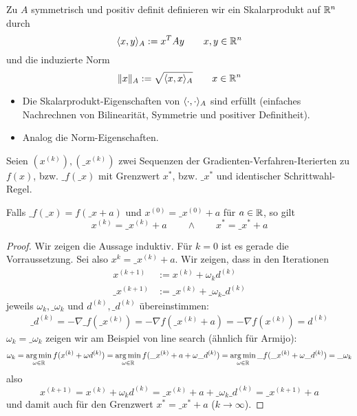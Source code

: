 \documentclass[
]{mycourse}
\begin{document}
\begin{df} \label{4.14}
	Zu $A$ symmetrisch und positiv definit definieren wir ein Skalarprodukt auf $\mathbb{R}^n$ durch
	\[
		\langle x, y\rangle_A := x^T A y
		\qquad x,y \in \mathbb{R}^n
	\]
	und die induzierte Norm
	\[
		\|x\|_A := \sqrt{\langle x,x\rangle_A}
		\qquad x \in \mathbb{R}^n
	\]
	\begin{note}
		\begin{itemize}
			\item
				Die Skalarprodukt-Eigenschaften von $\langle\cdot, \cdot\rangle_A$ sind erfüllt (einfaches Nachrechnen von Bilinearität, Symmetrie und positiver Definitheit).
			\item
				Analog die Norm-Eigenschaften.
		\end{itemize}
	\end{note}
\end{df}

\begin{lem*}[Translationsinvarianz]
	Seien $(x^{(k)}), (\_x^{(k)})$ zwei Sequenzen der Gradienten-Verfahren-Iterierten zu $f(x)$, bzw. $\_f(\_x)$ mit Grenzwert $x^*$, bzw. $\_x^*$ und identischer Schrittwahl-Regel.

	Falls $\_f(\_x) = f(\_x + a)$ und $x^{(0)} = \_x^{(0)} + a$ für $a \in \mathbb{R}$, so gilt
	\[
		x^{(k)} = \_x^{(k)} + a
		\qquad \land \qquad
		x^* = \_x^* + a
	\]
	\begin{proof}
		Wir zeigen die Aussage induktiv.
		Für $k=0$ ist es gerade die Vorraussetzung.
		Sei also $x^{k} = \_x^{(k)} + a$.
		Wir zeigen, dass in den Iterationen
		\begin{align*}
			x^{(k+1)} &:= x^{(k)} + \omega_k d^{(k)} \\
			\_x^{(k+1)} &:= \_x^{(k)} + \_\omega_k \_d^{(k)}
		\end{align*}
		jeweils $\omega_k, \_\omega_k$ und $d^{(k)}, \_d^{(k)}$ übereinstimmen:
		\begin{align*}
			\_d^{(k)} = -\nabla \_f(\_x^{(k)}) = - \nabla f(\_x^{(k)} + a) = - \nabla f(x^{(k)}) = d^{(k)}
		\end{align*}
		$\omega_k = \_\omega_k$ zeigen wir am Beispiel von line search (ähnlich für Armijo):
		\[
			\omega_k = \argmin_{\omega\in\R} f(x^{(k)} + \omega d^{(k)}) = \argmin_{\omega\in \R} f(\_x^{(k)} + a + \omega \_d^{(k)})  = \argmin_{\omega\in \R} \_f(\_x^{(k)} + \omega \_d^{(k)}) = \_\omega_k
		\]
		also
		\[
			x^{(k+1)} = x^{(k)} + \omega_k d^{(k)} = \_x^{(k)} + a + \_\omega_k \_d^{(k)} =\_ x^{(k+1)} +a
		\]
		und damit auch für den Grenzwert $x^* = \_x^* + a$ ($k \to \infty$).
	\end{proof}
\end{lem*}
\end{document}
